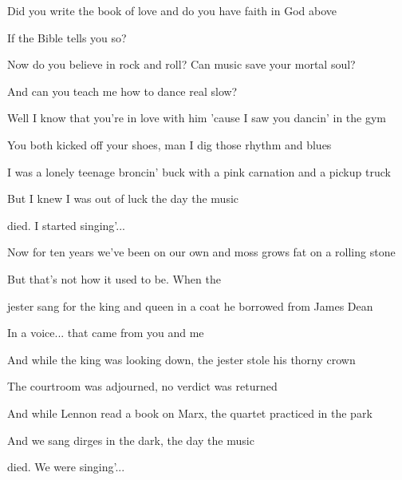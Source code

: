 \begin{song}
\bigskip

 \par
{} Did you write the book of love and do you have faith in God above \par
{} If the Bible tells you so? \par
Now do you believe in rock and roll? Can music save your mortal soul? \par
And  can you teach me  how to dance real slow? \par

\bigskip

Well I know that you're in love with him 'cause I saw you dancin' in the gym \par
You both kicked off your shoes, man I dig those rhythm and blues \par
I was a lonely teenage broncin' buck with a pink carnation and a pickup truck \par
But I knew I was out of luck the day the music \par
{}died.   I started singing'... \par

\bigskip

\Chorus \par

\bigskip

Now for ten years we've been on our own and moss grows fat on a rolling stone \par
But that's not how it used to be. When the \par
{}jester sang for the king and queen in a coat he borrowed from James Dean \par
In a voice... that came from you and me \par

\bigskip

And while the king was looking down, the jester stole his thorny crown \par
The courtroom was adjourned, no verdict was returned \par
And while Lennon read a book on Marx, the quartet practiced in the park \par
And we sang dirges in the dark, the day the music \par
{}died.   We were singing'... \par


\end{song}

